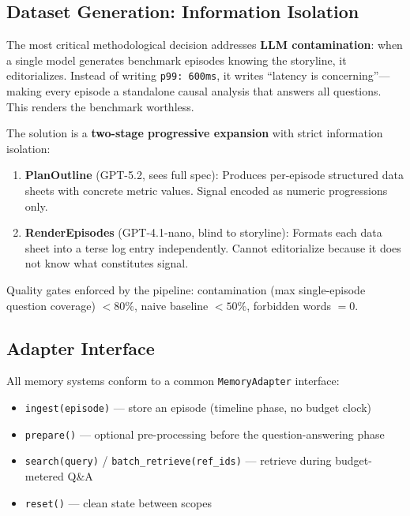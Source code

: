 \documentclass[11pt,letterpaper]{article}
\begin{document}
\subsection{Dataset Generation: Information Isolation}

The most critical methodological decision addresses \textbf{LLM contamination}: when a single model generates benchmark episodes knowing the storyline, it editorializes. Instead of writing \texttt{p99: 600ms}, it writes ``latency is concerning''---making every episode a standalone causal analysis that answers all questions. This renders the benchmark worthless.

The solution is a \textbf{two-stage progressive expansion} with strict information isolation:

\begin{enumerate}[nosep]
  \item \textbf{PlanOutline} (GPT-5.2, sees full spec): Produces per-episode structured data sheets with concrete metric values. Signal encoded as numeric progressions only.
  \item \textbf{RenderEpisodes} (GPT-4.1-nano, blind to storyline): Formats each data sheet into a terse log entry independently. Cannot editorialize because it does not know what constitutes signal.
\end{enumerate}

Quality gates enforced by the pipeline: contamination (max single-episode question coverage) $<80\%$, naive baseline $<50\%$, forbidden words $= 0$.

\subsection{Adapter Interface}

All memory systems conform to a common \texttt{MemoryAdapter} interface:

\begin{itemize}[nosep]
  \item \texttt{ingest(episode)} --- store an episode (timeline phase, no budget clock)
  \item \texttt{prepare()} --- optional pre-processing before the question-answering phase
  \item \texttt{search(query)} / \texttt{batch\_retrieve(ref\_ids)} --- retrieve during budget-metered Q\&A
  \item \texttt{reset()} --- clean state between scopes
\end{itemize}
\end{document}
